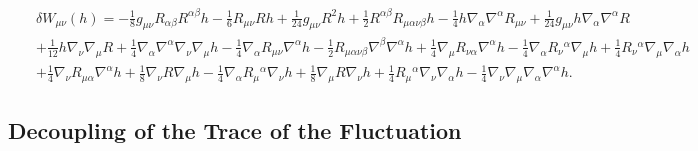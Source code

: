 \documentclass[aps]{revtex4}
\begin{document}
\begin{eqnarray}
&&\delta W_{\mu\nu}(h)=- \tfrac{1}{8} g_{\mu \nu} R_{\alpha \beta} R^{\alpha \beta} h -  \tfrac{1}{6} R_{\mu \nu} R h + \tfrac{1}{24} g_{\mu \nu} R^2 h + \tfrac{1}{2} R^{\alpha \beta} R_{\mu \alpha \nu \beta} h -  \tfrac{1}{4} h \nabla_{\alpha}\nabla^{\alpha}R_{\mu \nu} + \tfrac{1}{24} g_{\mu \nu} h \nabla_{\alpha}\nabla^{\alpha}R 
\nonumber\\
&&+ \tfrac{1}{12} h \nabla_{\nu}\nabla_{\mu}R
+\tfrac{1}{4} \nabla_{\alpha}\nabla^{\alpha}\nabla_{\nu}\nabla_{\mu}h -  \tfrac{1}{4} \nabla_{\alpha}R_{\mu \nu} \nabla^{\alpha}h -  \tfrac{1}{2} R_{\mu \alpha \nu \beta} \nabla^{\beta}\nabla^{\alpha}h + \tfrac{1}{4} \nabla_{\mu}R_{\nu \alpha}\nabla^{\alpha}h  -  \tfrac{1}{4} \nabla_{\alpha}R_{\nu}{}^{\alpha} \nabla_{\mu}h + \tfrac{1}{4} R_{\nu}{}^{\alpha} \nabla_{\mu}\nabla_{\alpha}h
\nonumber\\
&& + \tfrac{1}{4} \nabla_{\nu}R_{\mu \alpha} \nabla^{\alpha}h + \tfrac{1}{8} \nabla_{\nu}R\nabla_{\mu}h  -  \tfrac{1}{4} \nabla_{\alpha}R_{\mu}{}^{\alpha} \nabla_{\nu}h + \tfrac{1}{8} \nabla_{\mu}R \nabla_{\nu}h + \tfrac{1}{4} R_{\mu}{}^{\alpha} \nabla_{\nu}\nabla_{\alpha}h  
-  \tfrac{1}{4} \nabla_{\nu}\nabla_{\mu}\nabla_{\alpha}\nabla^{\alpha}h.
\label{AP45}
\end{eqnarray}
%

\subsection{Decoupling of the Trace of the Fluctuation}
\end{document}
